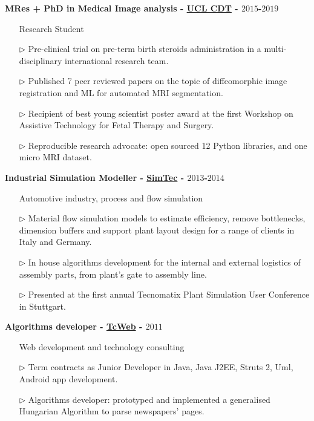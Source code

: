 \documentclass[margin,line]{resume}
\begin{document}
\begin{resume}
{\bf MRes + PhD in Medical Image analysis - \href{https://www.ucl.ac.uk/medical-physics-biomedical-engineering/study/postgraduate-research/medical-imaging-mres-mphilphd}{UCL CDT} - $2015$-$2019$} 
\vspace{0.1cm}
\begin{itemize}
    \item[] \hspace{-1.0cm} Research Student
    \item[$\triangleright$] Pre-clinical trial on pre-term birth steroids administration in a multi-disciplinary international research team.
    \item[$\triangleright$] Published 7 peer reviewed papers on the topic of diffeomorphic image registration and ML for automated MRI segmentation.
    \item[$\triangleright$] Recipient of best young scientist poster award at the first Workshop on Assistive Technology for Fetal Therapy and Surgery.
    \item[$\triangleright$] Reproducible research advocate: open sourced 12 Python libraries, and one micro MRI dataset.
\end{itemize}


{\bf Industrial Simulation Modeller - \href{https://www.simtec-group.eu/it/}{SimTec} - $2013$-$2014$}
\vspace{0.1cm}
\begin{itemize}
    \item[] \hspace{-1.0cm} Automotive industry, process and flow simulation
    \item[$\triangleright$] Material flow simulation models to estimate efficiency, remove bottlenecks, dimension buffers and support plant layout design for a range of clients in Italy and Germany.
    \item[$\triangleright$] In house algorithms development for the internal and external logistics of assembly parts, from plant's gate to assembly line. 
    \item[$\triangleright$] Presented at the first annual Tecnomatix Plant Simulation User Conference in Stuttgart.
\end{itemize}


{\bf Algorithms developer - \href{https://www.tc-web.it}{TcWeb} - $2011$}
\vspace{0.1cm}
\begin{itemize}
    \item[] \hspace{-1.0cm} Web development and technology consulting
    \item[$\triangleright$] Term contracts as Junior Developer in Java, Java J2EE,
    Struts 2, Uml, Android app development. 
    \item[$\triangleright$] Algorithms developer: prototyped and implemented a generalised Hungarian Algorithm to parse newspapers' pages.
\end{itemize}



\end{resume}
\end{document}
